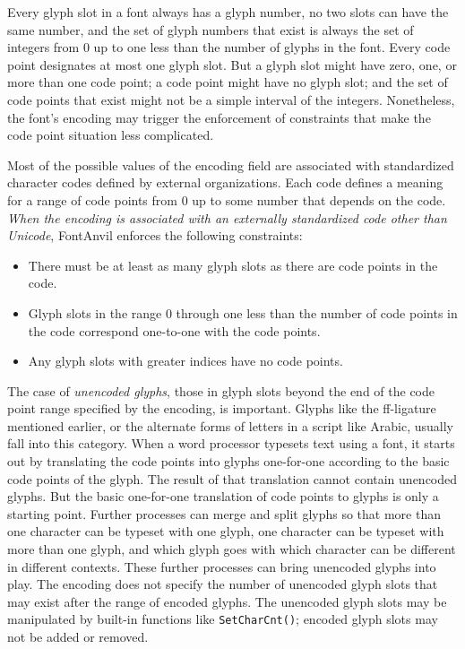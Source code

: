 \documentclass[11pt]{report}
\begin{document}
\begin{framed}
Every glyph slot in a font always has a glyph number, no two slots can have
the same number, and the set of glyph numbers that exist is always the set
of integers from 0 up to one less than the number of glyphs in the font. 
Every code point designates at most one glyph slot.  But a glyph slot might
have zero, one, or more than one code point; a code point might have no
glyph slot; and the set of code points that exist might not be a simple
interval of the integers.  Nonetheless, the font's encoding may trigger the
enforcement of constraints that make the code point situation less
complicated.
\end{framed}

Most of the possible values of the encoding field are associated with
standardized character codes defined by external organizations.  Each code
defines a meaning for a range of code points from 0 up to some number that
depends on the code.  \emph{When the encoding is associated with an
externally standardized code other than Unicode}, FontAnvil enforces the
following constraints:
\begin{itemize}
\item There must be at least as many glyph slots as there are code points in
the code.
\item Glyph slots in the range 0 through one less than the number of code
points in the code correspond one-to-one with the code points.
\item Any glyph slots with greater indices have no code points.
\end{itemize}

The case of \emph{unencoded glyphs}, those in glyph slots beyond the end of
the code point range specified by the encoding, is important.  Glyphs like
the ff-ligature mentioned earlier, or the alternate forms of letters in a
script like Arabic, usually fall into this category.  When a word processor
typesets text using a font, it starts out by translating the code points
into glyphs one-for-one according to the basic code points of the glyph. 
The result of that translation cannot contain unencoded glyphs.  But the
basic one-for-one translation of code points to glyphs is only a starting
point.  Further processes can merge and split glyphs so that more than one
character can be typeset with one glyph, one character can be typeset with
more than one glyph, and which glyph goes with which character can be
different in different contexts.  These further processes can bring
unencoded glyphs into play.  The encoding does not specify the number of
unencoded glyph slots that may exist after the range of encoded glyphs.  The
unencoded glyph slots may be manipulated by built-in functions like
\texttt{SetCharCnt()}; encoded glyph slots may not be added or removed.
\end{document}
